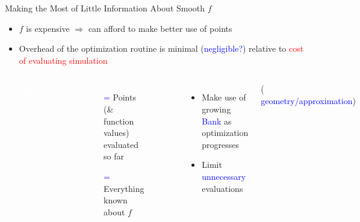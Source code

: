 \documentclass[handout,aspectratio=54]{beamer}
\numberwithin{theorem}{section}
\begin{document}
\begin{frame}{Making the Most of Little Information About Smooth $f$}
\begin{itemize}
\item $f$ is expensive $\Rightarrow$ can afford to make better use of points
\item Overhead of the optimization routine is minimal (\textcolor{blue}{negligible?}) relative to \textcolor{red}{cost of evaluating simulation}
\end{itemize}

\begin{columns}
\includegraphics[width=\textwidth]{fig/20-2.jpg}

\colorbox[rgb]{0.5,0.6,0.7}{\textcolor{white}{\underline{Bank} of data, $\{x^i,f(x^i)\}^k_{i=1}$:}}
\begin{itemize}
\item[\textcolor{blue}{=}] Points (\& function values) evaluated so far
\item[\textcolor{blue}{=}] Everything known about $f$
\end{itemize}

\colorbox[rgb]{0.5,0.6,0.7}{\textcolor{white}{Idea:}}
\begin{itemize}
\item Make use of growing \textcolor{blue}{Bank} as optimization progresses
\item Limit \textcolor{blue}{unnecessary} evaluations
\end{itemize}
\small\flushright
( \textcolor{blue}{geometry/approximation})
\end{columns}
\end{frame}
\end{document}
